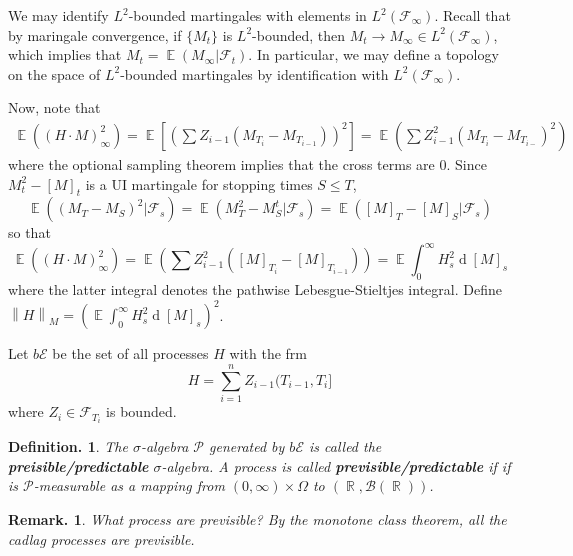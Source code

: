 \documentclass[11pt, a4paper]{memoir}
\DeclareMathOperator{\R}{{\mathbb{R}}}
\newcommand{\norm}[1]{\ensuremath{\left\lVert#1\right\rVert}}
\theoremstyle{change}
\theoremstyle{plain}
\theoremstyle{nonumberplain}
\newtheorem{definition}{Definition.}
\newtheorem{remark}{Remark.}
\DeclareMathOperator{\E}{{\mathbb{E}}}
\renewcommand{\d}[1]{\ensuremath{\operatorname{d}\!{#1}}}
\newcommand{\defn}[1]{{\boldmath\bfseries #1}}
\numberwithin{equation}{section}
\begin{document}
We may identify $L^2$-bounded martingales with elements in $L^2(\mathcal{F}_\infty)$.
Recall that by maringale convergence, if $\{M_t\}$ is $L^2$-bounded, then $M_t\to M_\infty\in L^2(\mathcal{F}_\infty)$, which implies that $M_t=\E(M_\infty|\mathcal{F}_t)$.
In particular, we may define a topology on the space of $L^2$-bounded martingales by identification with $L^2(\mathcal{F}_\infty)$.

Now, note that
\begin{align*}
    \E((H\cdot M)_\infty^2)=\E[(\sum Z_{i-1}(M_{T_i}-M_{T_{i-1}}))^2]=\E(\sum Z_{i-1}^2(M_{T_i}-M_{T_{i-}})^2)
\end{align*}
where the optional sampling theorem implies that the cross terms are 0.
Since $M_t^2-[M]_t$ is a UI martingale for stopping times $S\leq T$,
\begin{equation*}
    \E((M_T-M_S)^2|\mathcal{F}_s)=\E(M_T^2-M_S^t|\mathcal{F}_s)=\E([M]_T-[M]_S|\mathcal{F}_s)
\end{equation*}
so that
\begin{equation*}
    \E((H\cdot M)_\infty^2)=\E(\sum Z_{i-1}^2([M]_{T_i}-[M]_{T_{i-1}}))=\E\int_0^\infty H_s^2\d{[M]_s}
\end{equation*}
where the latter integral denotes the pathwise Lebesgue-Stieltjes integral.
Define $\norm{H}_M=(\E\int_0^\infty H_s^2\d{[M]_s})^2$.

Let $b\mathcal{E}$ be the set of all processes $H$ with the frm
\begin{equation*}
    H = \sum_{i=1}^n Z_{i-1}(T_{i-1},T_i]
\end{equation*}
where $Z_i\in\mathcal{F}_{T_i}$ is bounded.
\begin{definition}
    The $\sigma$-algebra $\mathcal{P}$ generated by $b\mathcal{E}$ is called the \defn{preisible/predictable} $\sigma$-algebra.
    A process is called \defn{previsible/predictable} if if is $\mathcal{P}$-measurable as a mapping from $(0,\infty)\times\Omega$ to $(\R,\mathcal{B}(\R))$.
\end{definition}
\begin{remark}
    What process are previsible?
    By the monotone class theorem, all the cadlag processes are previsible.
\end{remark}
\end{document}
